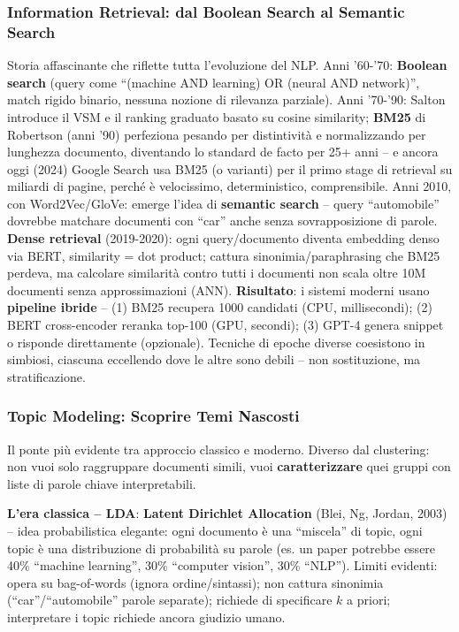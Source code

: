 \documentclass[12pt,a4paper]{article}
\begin{document}
\subsubsection{Information Retrieval: dal Boolean Search al Semantic Search}

Storia affascinante che riflette tutta l'evoluzione del NLP. Anni '60-'70: \textbf{Boolean search} (query come ``(machine AND learning) OR (neural AND network)'', match rigido binario, nessuna nozione di rilevanza parziale). Anni '70-'90: Salton introduce il VSM e il ranking graduato basato su cosine similarity; \textbf{BM25} di Robertson (anni '90) perfeziona pesando per distintivit\`a e normalizzando per lunghezza documento, diventando lo standard de facto per 25+ anni -- e ancora oggi (2024) Google Search usa BM25 (o varianti) per il primo stage di retrieval su miliardi di pagine, perch\'e \`e velocissimo, deterministico, comprensibile. Anni 2010, con Word2Vec/GloVe: emerge l'idea di \textbf{semantic search} -- query ``automobile'' dovrebbe matchare documenti con ``car'' anche senza sovrapposizione di parole. \textbf{Dense retrieval} (2019-2020): ogni query/documento diventa embedding denso via BERT, similarity = dot product; cattura sinonimia/paraphrasing che BM25 perdeva, ma calcolare similarit\`a contro tutti i documenti non scala oltre 10M documenti senza approssimazioni (ANN). \textbf{Risultato}: i sistemi moderni usano \textbf{pipeline ibride} -- (1) BM25 recupera 1000 candidati (CPU, millisecondi); (2) BERT cross-encoder reranka top-100 (GPU, secondi); (3) GPT-4 genera snippet o risponde direttamente (opzionale). Tecniche di epoche diverse coesistono in simbiosi, ciascuna eccellendo dove le altre sono debili -- non sostituzione, ma stratificazione.

\subsubsection{Topic Modeling: Scoprire Temi Nascosti}

Il ponte pi\`u evidente tra approccio classico e moderno. Diverso dal clustering: non vuoi solo raggruppare documenti simili, vuoi \textbf{caratterizzare} quei gruppi con liste di parole chiave interpretabili.

\textbf{L'era classica -- LDA}: \textbf{Latent Dirichlet Allocation} (Blei, Ng, Jordan, 2003) -- idea probabilistica elegante: ogni documento \`e una ``miscela'' di topic, ogni topic \`e una distribuzione di probabilit\`a su parole (es. un paper potrebbe essere 40\% ``machine learning'', 30\% ``computer vision'', 30\% ``NLP''). Limiti evidenti: opera su bag-of-words (ignora ordine/sintassi); non cattura sinonimia (``car''/``automobile'' parole separate); richiede di specificare $k$ a priori; interpretare i topic richiede ancora giudizio umano.
\end{document}
